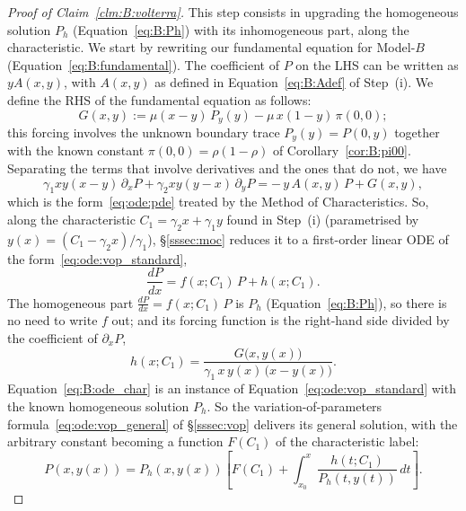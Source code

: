 \begin{proof}[Proof of Claim~\ref{clm:B:volterra}]
    This step consists in upgrading the homogeneous solution $P_h$ (Equation~\eqref{eq:B:Ph}) with its inhomogeneous part, along the characteristic.
    We start by rewriting our fundamental equation for Model-$B$ (Equation~\eqref{eq:B:fundamental}). The coefficient of $P$ on the LHS can be written as $yA(x,y)$, with $A(x,y)$ as defined in Equation~\eqref{eq:B:Adef} of Step~(i). We define the RHS of the fundamental equation as follows:
    \begin{equation}
        G(x,y) := \mu(x-y)\,P_y(y) - \mu\,x(1-y)\,\pi(0,0);
        \label{eq:B:Gdef}
    \end{equation}
    this forcing involves the unknown boundary trace $P_y(y)=P(0,y)$ together with the known constant $\pi(0,0)=\rho(1-\rho)$ of Corollary~\ref{cor:B:pi00}. Separating the terms that involve derivatives and the ones that do not, we have
    \begin{equation*}
        \gamma_1 xy(x-y)\,\partial_x P + \gamma_2 xy(y-x)\,\partial_y P = -\,y\,A(x,y)\,P + G(x,y),
    \end{equation*}
    which is the form~\eqref{eq:ode:pde} treated by the Method of Characteristics.
    So, along the characteristic $C_1=\gamma_2 x+\gamma_1 y$ found in Step~(i)
    (parametrised by $y(x)=(C_1-\gamma_2 x)/\gamma_1$), \S\ref{sssec:moc} reduces it to a
    first-order linear ODE of the form~\eqref{eq:ode:vop_standard},
    \begin{equation}
        \frac{dP}{dx} = f(x;C_1)\,P + h(x;C_1).
        \label{eq:B:ode_char}
    \end{equation}
    The homogeneous part $\frac{dP}{dx}=f(x;C_1)\,P$ is $P_h$ (Equation~\eqref{eq:B:Ph}), so there is no need to write $f$ out; and its forcing function is the right-hand side divided by the coefficient of
    $\partial_x P$,
    \begin{equation}
        h(x;C_1)=\frac{G\bigl(x,y(x)\bigr)}{\gamma_1\,x\,y(x)\,\bigl(x-y(x)\bigr)}.
        \label{eq:B:hdef}
    \end{equation}
    Equation~\eqref{eq:B:ode_char} is an instance of Equation~\eqref{eq:ode:vop_standard} with the known homogeneous solution $P_h$. So the variation-of-parameters formula~\eqref{eq:ode:vop_general} of \S\ref{sssec:vop} delivers its general solution, with the arbitrary constant becoming a function $F(C_1)$ of the characteristic
    label:
    \begin{equation}
        P(x,y(x)) = P_h(x,y(x))\!\left[F(C_1) + \int_{x_0}^{x} \frac{h(t;C_1)}{P_h(t,y(t))}\,dt\right].
        \label{eq:B:variation}
    \end{equation}
    

\end{proof}
